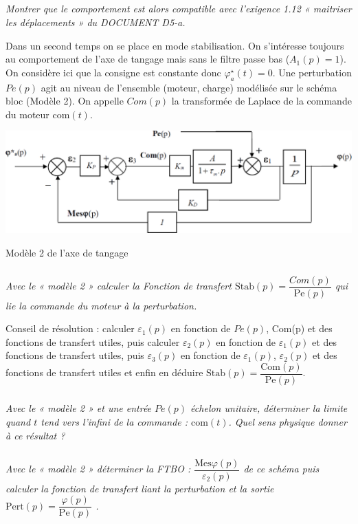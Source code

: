 \documentclass[10pt,fleqn]{article} %
\begin{document}
\subparagraph{\label{q26}}\textit{Montrer que le comportement est alors compatible avec l’exigence 1.12 « maitriser les déplacements » du DOCUMENT D5-a.}

Dans un second temps on se place en mode stabilisation. On s’intéresse toujours au comportement de l’axe de tangage mais sans le filtre passe bas ($A_1(p)=1$).
On considère ici que la consigne est constante donc $\varphi^{\star}_a(t)=0$. Une perturbation $Pe(p)$ agit au niveau de l’ensemble (moteur, charge) modélisée sur le schéma bloc (Modèle 2). On appelle $Com(p)$ la transformée de Laplace de la commande du moteur $\text{com}(t)$.

\begin{center}
\includegraphics[width=\linewidth]{fig_e}

Modèle 2 de l'axe de tangage
\end{center}


\subparagraph{\label{q27}}\textit{Avec le « modèle 2 » calculer la Fonction de transfert $\text{Stab}(p)=\dfrac{Com(p)}{\text{Pe}(p)}$  qui lie la commande du moteur à la perturbation.}

Conseil de résolution : calculer $\varepsilon_1(p)$ en fonction de $Pe(p)$, Com(p) et des fonctions de transfert utiles, puis
calculer $\varepsilon_2(p)$
en fonction de $\varepsilon_1(p)$
et des fonctions de transfert utiles, 
puis $\varepsilon_3(p)$
en fonction de $\varepsilon_1(p)$, $\varepsilon_2(p)$ et des fonctions de transfert utiles et enfin en déduire 
 $\text{Stab}(p)=\dfrac{\text{Com}(p)}{\text{Pe}(p)}$.

\subparagraph{\label{q28}}\textit{Avec le « modèle 2 » et une entrée $Pe(p)$ échelon unitaire, déterminer la limite quand $t$ tend vers l’infini de la commande : $\text{com}(t)$. Quel sens physique donner à ce résultat ?}

\subparagraph{\label{q29}}\textit{Avec le « modèle 2 » déterminer la FTBO :  $\dfrac{\text{Mes}\varphi(p)}{\varepsilon_2(p)}$ de ce schéma puis calculer la fonction de transfert liant la perturbation et la sortie $\text{Pert}(p)=\dfrac{\varphi(p)}{\text{Pe}(p)}$  .}
\end{document}
